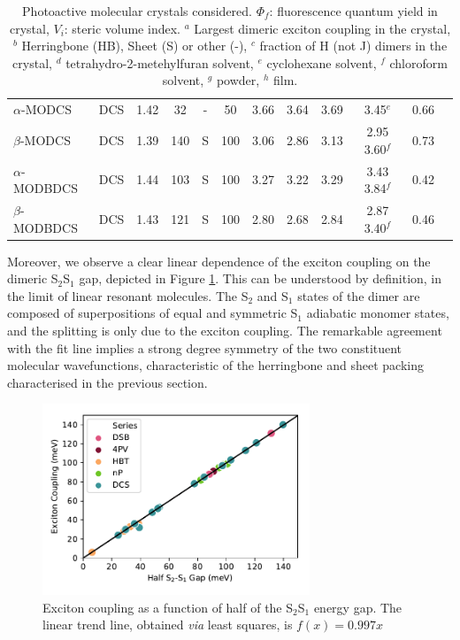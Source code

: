 \begin{table}
{\begin{tabular}{@{}lccccccccccc@{}}
$\alpha$-MODCS   & DCS     & 1.42         & 32        & -  & 50 & 3.66      & 3.64       & 3.69       & 3.45$^e$\cite{Shi2017}                        & 0.66          \\
$\beta$-MODCS   & DCS     & 1.39         & 140       & S   & 100  & 3.06      & 2.86       & 3.13       & 2.95 3.60$^f$\cite{Shi2017}                   & 0.73          \\
$\alpha$-MODBDCS & DCS     & 1.44         & 103       & S   & 100  & 3.27      & 3.22       & 3.29       & 3.43 3.84$^f$\cite{Shi2017}                   & 0.42          \\
$\beta$-MODBDCS & DCS     & 1.43         & 121       & S   & 100  & 2.80      & 2.68       & 2.84       & 2.87 3.40$^f$\cite{Shi2017}                   & 0.46          \\ \bottomrule
\end{tabular}
}
\caption{Photoactive molecular crystals considered. $\Phi_f$: fluorescence quantum yield in crystal, $V_i$: steric volume index. $^a$ Largest dimeric exciton coupling in the crystal, $^b$ Herringbone (HB), Sheet (S) or other (-), $^c$ fraction of H (not J) dimers in the crystal, $^d$ tetrahydro-2-metehylfuran solvent, $^e$ cyclohexane solvent, $^f$ chloroform solvent, $^g$ powder, $^h$ film.}
\label{tab:molecules}

\end{table}

Moreover, we observe a clear linear dependence of the exciton coupling on the dimeric S$_2$\textendash{}S$_1$ gap, depicted in Figure \ref{fig:half}. This can be understood by definition, in the limit of linear resonant molecules.\cite{Spano2016} The S$_2$ and S$_1$ states of the dimer are composed of superpositions of equal and symmetric S$_1$ adiabatic monomer states, and the splitting is only due to the exciton coupling. The remarkable agreement with the fit line implies a strong degree symmetry of the two constituent molecular wavefunctions, characteristic of the herringbone and sheet packing characterised in the previous section.

\begin{figure}
\centering
\includegraphics[width=8cm]{Chapters/7Applications/half_gap.pdf}
\caption{Exciton coupling as a function of half of the S$_2$\textendash{}S$_1$ energy gap. The linear trend line, obtained \textit{via} least squares, is $f(x) = 0.997x$}
\label{fig:half}
\end{figure}

